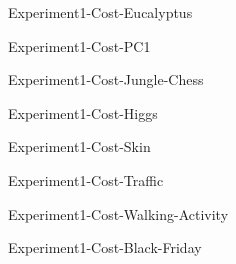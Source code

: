 \documentclass[sigconf,nonacm,screen]{acmart}
\begin{document}
  
        \begin{figure}[!ht]
            \centering
            
            \caption{Experiment1-Cost-Eucalyptus}
        \end{figure}  
    
  
        \begin{figure}[!ht]
            \centering
            
            \caption{Experiment1-Cost-PC1}
        \end{figure}  
    
  
        \begin{figure}[!ht]
            \centering
            
            \caption{Experiment1-Cost-Jungle-Chess}
        \end{figure}  
    
  
        \begin{figure}[!ht]
            \centering
            
            \caption{Experiment1-Cost-Higgs}
        \end{figure}  
    
  
        \begin{figure}[!ht]
            \centering
            
            \caption{Experiment1-Cost-Skin}
        \end{figure}  
    
  
        \begin{figure}[!ht]
            \centering
            
            \caption{Experiment1-Cost-Traffic}
        \end{figure}  
    
  
        \begin{figure}[!ht]
            \centering
            
            \caption{Experiment1-Cost-Walking-Activity}
        \end{figure}  
    
  
        \begin{figure}[!ht]
            \centering
            
            \caption{Experiment1-Cost-Black-Friday}
        \end{figure}  
    
\end{document}
